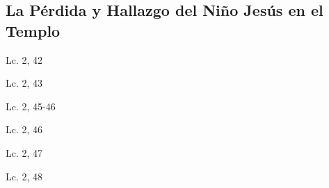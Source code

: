 \documentclass[a4paper,11pt,sans]{article}
\begin{document}
    \subsection*{\hfil La Pérdida y Hallazgo del Niño Jesús en el Templo \hfil}
      
      \begin{multicols}{2}

      \columnbreak
          
      \end{multicols}
      \begin{center}
        Lc. 2, 42     
      \end{center}
      
      \begin{multicols}{2}

      \columnbreak
          
      \end{multicols}
      \begin{center}
        Lc. 2, 43        
      \end{center}
      
      \begin{multicols}{2}

      \columnbreak
          
      \end{multicols}
      \begin{center}
        Lc. 2, 45-46       
      \end{center}
      
      \begin{multicols}{2}

      \columnbreak
          
      \end{multicols}
      \begin{center}
        Lc. 2, 46       
      \end{center}
      
      \begin{multicols}{2}

      \columnbreak
          
      \end{multicols}
      \begin{center}
        Lc. 2, 47     
      \end{center}

      \begin{multicols}{2}

      \columnbreak
          
      \end{multicols}
      \begin{center}
        Lc. 2, 48     
      \end{center}
      
\end{document}
